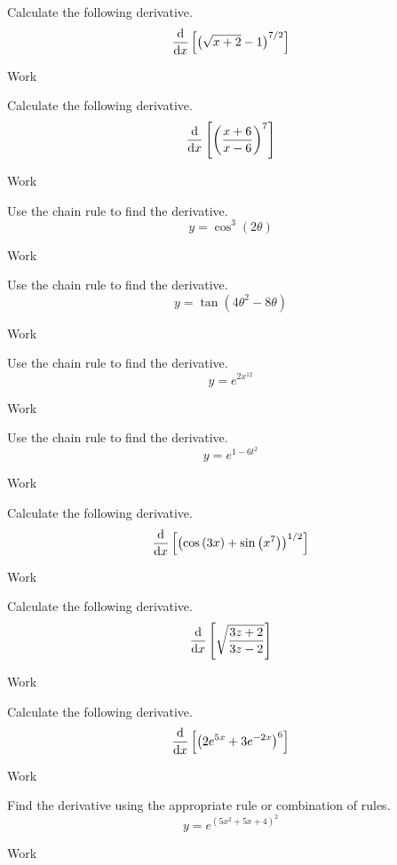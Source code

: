 \documentclass[12pt,addpoints, answers, fleqn]{exam}
\begin{document}
\begin{teacher}
\begin{questions}
Calculate the following derivative.
\[
\frac{{\rm{d}}}{{\rm{d}}x} \left[ \left( \sqrt{x+2} -1 \right)^{7/2} \right]
\]
\begin{solution}
Work
\end{solution}
\question 	%

Calculate the following derivative.
\[
\frac{{\rm{d}}}{{\rm{d}}x} \left[ \left(\frac{x+6}{x-6}\right)^7 \right]
\]
\begin{solution}
Work
\end{solution}
\question 	%

Use the chain rule to find the derivative.
\[
y = \cos^3 \left(2\theta\right)
\]
\begin{solution}
Work
\end{solution}
\question 	%

Use the chain rule to find the derivative.
\[
y = \tan \left( 4 \theta^2 - 8 \theta \right)
\]
\begin{solution}
Work
\end{solution}
\question 	%

Use the chain rule to find the derivative.
\[
y = e^{2x^{12}}
\]
\begin{solution}
Work
\end{solution}
\question 	%

Use the chain rule to find the derivative.
\[
y = e^{1-6t^2}
\]
\begin{solution}
Work
\end{solution}
\question 	%

Calculate the following derivative.
\[
\frac{{\rm{d}}}{{\rm{d}}x} \left[ \left( \cos \left(3x\right) + \sin \left( x^7\right)\right)^{1/2} \right]
\]
\begin{solution}
Work
\end{solution}
\question 	%

Calculate the following derivative.
\[
\frac{{\rm{d}}}{{\rm{d}}x} \left[ \sqrt{\frac{3z+2}{3z-2}} \right]
\]
\begin{solution}
Work
\end{solution}
\question 	%

Calculate the following derivative.
\[
\frac{{\rm{d}}}{{\rm{d}}x} \left[ \left( 2e^{5x} + 3e^{-2x}\right)^{6} \right]
\]
\begin{solution}
Work
\end{solution}
\question 	%

Find the derivative using the appropriate rule or combination of rules.
\[
y = e^{\left( 5x^2+5x+4\right)^2}
\]
\begin{solution}
Work
\end{solution}
\end{questions}
\end{teacher}
\vfill
\pagebreak
\end{document}

